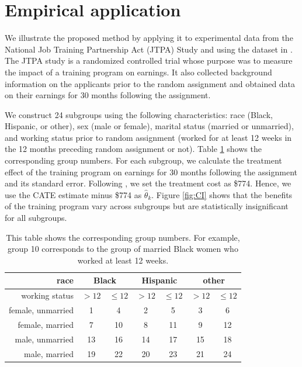 \documentclass[12pt,a4paper]{article}
\begin{document}
\section{Empirical application}\label{Sec:real}
We illustrate the proposed method by applying it to experimental data from the National Job Training Partnership Act (JTPA) Study and using the dataset in \cite{abadie2002instrumental}. The JTPA study is a randomized controlled trial whose purpose was to measure the impact of a training program on earnings. It also collected background information on the applicants prior to the random assignment and obtained data on their earnings for 30 months following the assignment.

We construct 24 subgroups using the following characteristics: race (Black, Hispanic, or other), sex (male or female), marital status (married or unmarried), and working status prior to random assignment (worked for at least 12 weeks in the 12 months preceding random assignment or not). Table \ref{table:group_number} shows the corresponding group numbers. For each subgroup, we calculate the treatment effect of the training program on earnings for 30 months following the assignment and its standard error. Following \cite{kitagawa2018should}, we set the treatment cost as \$774. Hence, we use the CATE estimate minus \$774 as $\hat{\theta}_k$. Figure \ref{fig:CI} shows that the benefits of the training program vary across subgroups but are statistically insignificant for all subgroups.

\begin{table}[h]
\begin{center}
\begin{tabular}{r|cccccc} \hline
    race & \multicolumn{2}{c}{Black} & \multicolumn{2}{c}{Hispanic} & \multicolumn{2}{c}{other} \\ \hline
    working status & $> 12$ & $\leq 12$ & $> 12$ & $\leq 12$ & $> 12$ & $\leq 12$ \\ \hline
   female, unmarried & 1 & 4 & 2 & 5 & 3 & 6 \\
   female, married & 7 & 10 & 8 & 11 & 9 & 12 \\
   male, unmarried & 13 & 16 & 14 & 17 & 15 & 18 \\
   male, married & 19 & 22 & 20 & 23 & 21 & 24 \\ \hline
\end{tabular}
\caption{This table shows the corresponding group numbers. For example, group 10 corresponds to the group of married Black women who worked at least 12 weeks.} \label{table:group_number}
\end{center}
\end{table}
\end{document}
